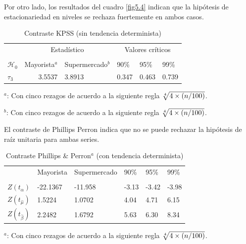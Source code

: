 \documentclass[12pt, twoside]{book}\usepackage[]{graphicx}\usepackage[]{color}
\numberwithin{equation}{section}
\numberwithin{theorem}{section}
\numberwithin{teorema}{section}
\numberwithin{defi}{section}
\numberwithin{prop}{section}
\numberwithin{defi}{section}
\theoremstyle{plain}
\begin{document}
Por otro lado, los resultados del cuadro \ref{fig5.4} indican que la hipótesis de estacionariedad en niveles se rechaza fuertemente en ambos casos. 

\begin{table}[!htpb]
\centering
\begin{threeparttable}
\caption{Contraste KPSS (sin tendencia determinista) \label{fig5.4}}
\begin{tabular}{@{}lrllll@{}}
\toprule
\multicolumn{1}{l}{} & \multicolumn{2}{c}{Estadístico} &
\multicolumn{3}{c}{Valores críticos} \\
\cmidrule(l){2-3} \cmidrule(l){4-6} \\
\multicolumn{1}{l}{$\mathcal{H}_0$} & \multicolumn{1}{c}{Mayorista$^{a}$} &
 \multicolumn{1}{c}{Supermercado$^{b}$} &
\multicolumn{1}{l}{90\%}&
\multicolumn{1}{l}{95\%}&
\multicolumn{1}{l}{99\%}
\\
\midrule
$\tau_{3} $  & 3.5537 &  3.8913 & 0.347 & 0.463 & 0.739 \\
\bottomrule
\end{tabular}
\label{tab-7}
\begin{tablenotes}
\small 
\item $^{a}$: Con cinco rezagos de acuerdo a la siguiente regla $\root 4 \of {4 \times (n/100)}$. 
\item $^{b}$: Con cinco rezagos de acuerdo a la siguiente regla $\root 4 \of {4 \times (n/100)}$. 
\end{tablenotes}
\end{threeparttable}
\end{table}

El contraste de Phillips Perron indica que no se puede rechazar la hipótesis de raíz unitaria para ambas series. 



\begin{table}[!htpb]
\centering
\begin{threeparttable}
\caption{Contraste Phillips \& Perron$^{a}$ (con tendencia determinista)\label{tab:pperron1}}
\begin{tabular}{@{}llllll@{}}
\toprule
\multicolumn{1}{c}{} &
\multicolumn{1}{l}{Mayorista} &
\multicolumn{1}{l}{Supermercado} & 
90\% & 95\% & 99\% 
\\
\cmidrule(l){2-2} \cmidrule(l){3-3} \cmidrule(l){4-6} \\
$Z(t_{\hat{\alpha}})$ &-22.1367 & -11.958 & -3.13 & -3.42 & -3.98 \\ 
$Z(t_{\hat{\mu}})$    &  1.5224 & 1.0702  &  4.04 & 4.71  & 6.15  \\ 
$Z(t_{\hat{\beta}})$  &  2.2482 & 1.6792  &  5.63 & 6.30  & 8.34 \\
\bottomrule
\end{tabular}
\label{tab-4}
\begin{tablenotes}
\small 
\item $^{a}$: Con cinco rezagos de acuerdo a la siguiente regla $\root 4 \of {4 \times (n/100)}$. 
\end{tablenotes}
\end{threeparttable}
\end{table}
\end{document}
